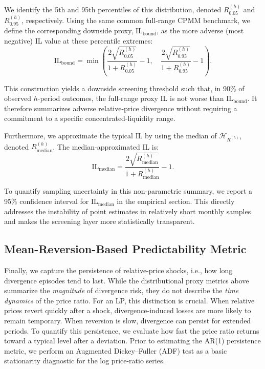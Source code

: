 \documentclass[anonymous]{lipics-v2021}
\begin{document}
We identify the 5th and 95th percentiles of this distribution, denoted $R^{(h)}_{0.05}$ and $R^{(h)}_{0.95}$, respectively.
{Using the same common full-range CPMM benchmark, we define the corresponding downside proxy, $\mathrm{IL}_{\text{bound}}$, as the more adverse (most negative) IL value at these percentile extremes:}
\begin{equation}
\label{eq:il_bound}
\mathrm{IL}_{\text{bound}} = \min\left(
\frac{2\sqrt{R^{(h)}_{0.05}}}{1+R^{(h)}_{0.05}} - 1,\quad
\frac{2\sqrt{R^{(h)}_{0.95}}}{1+R^{(h)}_{0.95}} - 1
\right).
\end{equation}

{This construction yields a downside screening threshold such that, in 90\% of observed $h$-period outcomes, the full-range proxy IL is not worse than $\mathrm{IL}_{\text{bound}}$. It therefore summarizes adverse relative-price divergence without requiring a commitment to a specific concentrated-liquidity range.}

Furthermore, we approximate the typical IL by using the median of \(\mathcal{H}_{R^{(h)}}\), denoted \(R^{(h)}_{\text{median}}\). The median-approximated IL is:
\begin{equation}
\label{eq:il_median}
\mathrm{IL}_{\text{median}} = \frac{2\sqrt{R^{(h)}_{\text{median}}}}{1+R^{(h)}_{\text{median}}} - 1.
\end{equation}

{To quantify sampling uncertainty in this non-parametric summary, we report a 95\% confidence interval for $\mathrm{IL}_{\text{median}}$ in the empirical section. This directly addresses the instability of point estimates in relatively short monthly samples and makes the screening layer more statistically transparent.}

\subsection{Mean-Reversion-Based Predictability Metric}
\label{subsubsec:mean_reversion_metric}

{Finally, we capture the persistence of relative-price shocks, i.e., how long divergence episodes tend to last. While the distributional proxy metrics above summarize the \emph{magnitude} of divergence risk, they do not describe the \emph{time dynamics} of the price ratio. For an LP, this distinction is crucial. When relative prices revert quickly after a shock, divergence-induced losses are more likely to remain temporary. When reversion is slow, divergence can persist for extended periods. To quantify this persistence, we evaluate how fast the price ratio returns toward a typical level after a deviation. Prior to estimating the AR(1) persistence metric, we perform an Augmented Dickey--Fuller (ADF) test as a basic stationarity diagnostic for the log price-ratio series.}
\end{document}
